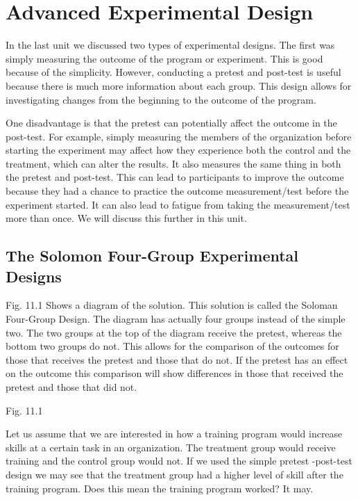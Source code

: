 \documentclass[]{book}
\theoremstyle{definition}
\theoremstyle{definition}
\theoremstyle{definition}
\theoremstyle{remark}
\begin{document}
\hypertarget{advanced-experimental-design}{%
\chapter{Advanced Experimental
Design}\label{advanced-experimental-design}}

In the last unit we discussed two types of experimental designs. The
first was simply measuring the outcome of the program or experiment.
This is good because of the simplicity. However, conducting a pretest
and post-test is useful because there is much more information about
each group. This design allows for investigating changes from the
beginning to the outcome of the program.

One disadvantage is that the pretest can potentially affect the outcome
in the post-test. For example, simply measuring the members of the
organization before starting the experiment may affect how they
experience both the control and the treatment, which can alter the
results. It also measures the same thing in both the pretest and
post-test. This can lead to participants to improve the outcome because
they had a chance to practice the outcome measurement/test before the
experiment started. It can also lead to fatigue from taking the
measurement/test more than once. We will discuss this further in this
unit.

\hypertarget{the-solomon-four-group-experimental-designs}{%
\section{The Solomon Four-Group Experimental
Designs}\label{the-solomon-four-group-experimental-designs}}

Fig. 11.1 Shows a diagram of the solution. This solution is called the
Soloman Four-Group Design. The diagram has actually four groups instead
of the simple two. The two groups at the top of the diagram receive the
pretest, whereas the bottom two groups do not. This allows for the
comparison of the outcomes for those that receives the pretest and those
that do not. If the pretest has an effect on the outcome this comparison
will show differences in those that received the pretest and those that
did not.

Fig. 11.1

Let us assume that we are interested in how a training program would
increase skills at a certain task in an organization. The treatment
group would receive training and the control group would not. If we used
the simple pretest -post-test design we may see that the treatment group
had a higher level of skill after the training program. Does this mean
the training program worked? It may.
\end{document}
